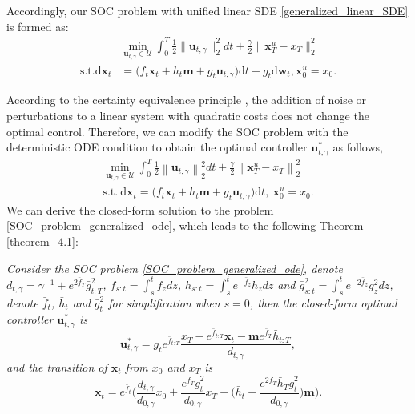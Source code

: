 Accordingly, our SOC problem with unified linear SDE \eqref{generalized_linear_SDE} is formed as: 
\begin{equation}\label{SOC_problem_generalized_sde}
\begin{aligned}
&\min_{\mathbf{u}_{t, \gamma}\in \mathcal{U} } \int_{0}^{T} \frac{1}{2} \|\mathbf{u}_{t, \gamma}\|_2^2 dt + \frac{\gamma}{2} \| \mathbf{x}_T^{u} - x_T\|_2^2 \\
\text{s.t.} \mathrm{d} \mathbf{x}_t &= \Big( f_t \mathbf{x}_t + h_t \mathbf{m} + g_t \mathbf{u}_{t, \gamma} \Big) \mathrm{d} t + g_t \mathrm{d} \mathbf{w}_t, \mathbf{x}_0^u = x_0.
\end{aligned}
\end{equation}

According to the certainty equivalence principle \cite{chen2024generativemodelingphasestochastic, RB}, the addition of noise or perturbations to a linear system with quadratic costs does not change the optimal control. Therefore, we can modify the SOC problem with the deterministic ODE condition to obtain the optimal controller $\mathbf{u}_{t, \gamma}^{*}$ as follows, 
\begin{equation}\label{SOC_problem_generalized_ode}
\begin{gathered}
\min_{\mathbf{u}_{t, \gamma}\in \mathcal{U} } \int_0^T \frac{1}{2} \left\|\mathbf{u}_{t, \gamma}\right\|_2^2 d t+\frac{\gamma}{2}\left\|\mathbf{x}_T^{u}-x_T\right\|_2^2 \\
\text{s.t.} \ \mathrm{d} \mathbf{x}_t = \Big( f_t \mathbf{x}_t + h_t \mathbf{m} + g_t \mathbf{u}_{t, \gamma} \Big) \mathrm{d} t, \ \mathbf{x}_0^u=x_0.
\end{gathered}
\end{equation}
We can derive the closed-form solution to the problem \eqref{SOC_problem_generalized_ode}, which leads to the following Theorem \ref{theorem_4.1}: 
\begin{theorem}\label{theorem_4.1} 
\textit{Consider the SOC problem \eqref{SOC_problem_generalized_ode}, denote $d_{t, \gamma} = \gamma^{-1} + e^{2\bar{f}_{T}} \bar{g}^2_{t:T}$, $\bar{f}_{s:t} = \int_{s}^{t} f_z dz$, $\bar{h}_{s:t} = \int_{s}^{t} e^{-\bar{f}_{z}} h_z dz$ and $\bar{g}^2_{s:t} = \int_{s}^{t} e^{-2\bar{f}_{z}}g^2_z dz$, denote $\bar{f}_{t}$, $\bar{h}_{t}$ and $\bar{g}^2_{t}$ for simplification when $s=0$, then the closed-form optimal controller $\mathbf{u}_{t,\gamma}^{*}$ is} 
\begin{equation}\label{general_optimal_controller}
\mathbf{u}_{t, \gamma}^{*} = g_t e^{\bar{f}_{t:T}} \frac{x_{T} - e^{\bar{f}_{t:T}} \mathbf{x}_t - \mathbf{m} e^{\bar{f}_{T}} \bar{h}_{t:T}}{d_{t, \gamma}},
\end{equation}
\textit{and the transition of $\mathbf{x}_t$ from $x_0$ and $x_T$ is}
\begin{equation}\label{general_interpolant}
\mathbf{x}_t = e^{\bar{f}_{t}} \Bigg(\frac{d_{t, \gamma}}{d_{0, \gamma}} x_0 + \frac{e^{\bar{f}_{T}} \bar{g}^2_{t}}{d_{0, \gamma}} x_T + \Big(\bar{h}_{t} - \frac{e^{2\bar{f}_{T}} \bar{h}_{T} \bar{g}^2_{t}}{d_{0, \gamma}}\Big) \mathbf{m}\Bigg). 
\end{equation}
\end{theorem}
